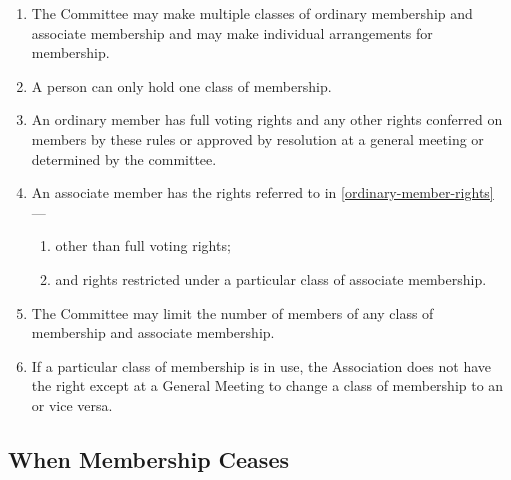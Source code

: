 \documentclass[../constitution.tex]{subfiles}
\begin{document}
\begin{enumerate}
\item The Committee may make multiple classes of ordinary membership and associate membership and may make individual arrangements for membership. 
\item A person  can only hold one class of membership. 
\item An ordinary member has full voting rights and any other rights conferred on members by these rules or approved by resolution at a general meeting or determined by the committee. \label{ordinary-member-rights}
\item An associate member has the rights referred to in  \ref{ordinary-member-rights} --- \label{associate-member-rights}
  \begin{enumerate}
  \item other than full voting rights;
  \item and rights restricted under a particular class of associate membership.
  \end{enumerate}
\item The Committee may limit the number of members of any class of membership and associate membership.
\item If a particular class of membership is in use, the Association does not have the right except at a General Meeting to change a class of  membership to an  or vice versa.
\end{enumerate}


\subsection{When Membership Ceases} \label{when-membership-ceases}
\end{document}
